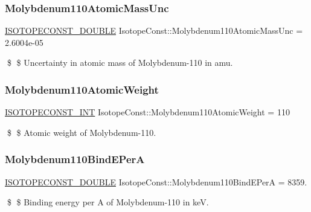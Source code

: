 \subsubsection{\texorpdfstring{Molybdenum110\+Atomic\+Mass\+Unc}{Molybdenum110AtomicMassUnc}}
{\footnotesize\ttfamily \mbox{\hyperlink{group___isotope_const-_macros_ga8f45a7272ce02c0b4c65c44636ed719a}{I\+S\+O\+T\+O\+P\+E\+C\+O\+N\+S\+T\+\_\+\+D\+O\+U\+B\+LE}} Isotope\+Const\+::\+Molybdenum110\+Atomic\+Mass\+Unc = 2.\+6004e-\/05}

\$ \$ Uncertainty in atomic mass of Molybdenum-\/110 in amu. \mbox{\label{group___isotope_const-_molybdenum-_mo110_ga9287d63ca28447359de074e211c7e140}} 
\subsubsection{\texorpdfstring{Molybdenum110\+Atomic\+Weight}{Molybdenum110AtomicWeight}}
{\footnotesize\ttfamily \mbox{\hyperlink{group___isotope_const-_macros_ga5f18360b3e99483a35c32d789e62621c}{I\+S\+O\+T\+O\+P\+E\+C\+O\+N\+S\+T\+\_\+\+I\+NT}} Isotope\+Const\+::\+Molybdenum110\+Atomic\+Weight = 110}

\$ \$ Atomic weight of Molybdenum-\/110. \mbox{\label{group___isotope_const-_molybdenum-_mo110_ga7782231e9c8ff011977784bd48fcb8b2}} 
\subsubsection{\texorpdfstring{Molybdenum110\+Bind\+E\+PerA}{Molybdenum110BindEPerA}}
{\footnotesize\ttfamily \mbox{\hyperlink{group___isotope_const-_macros_ga8f45a7272ce02c0b4c65c44636ed719a}{I\+S\+O\+T\+O\+P\+E\+C\+O\+N\+S\+T\+\_\+\+D\+O\+U\+B\+LE}} Isotope\+Const\+::\+Molybdenum110\+Bind\+E\+PerA = 8359.}

\$ \$ Binding energy per A of Molybdenum-\/110 in keV. \mbox{\label{group___isotope_const-_molybdenum-_mo110_gab4fc3b17b8547abf5904c3054f081944}} 
